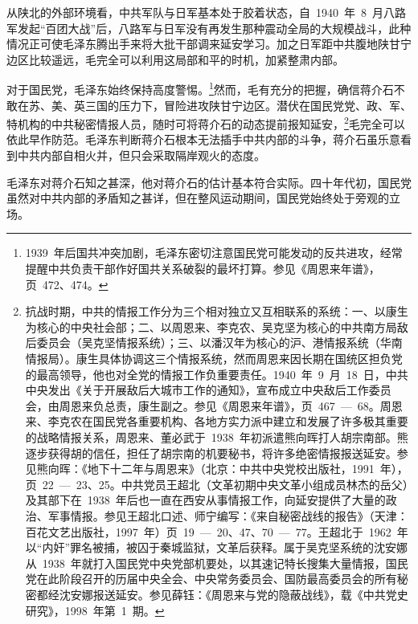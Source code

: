 从陕北的外部环境看，中共军队与日军基本处于胶着状态，自~1940~年~8~月八路军发起“百团大战”后，八路军与日军没有再发生那种震动全局的大规模战斗，此种情况正可使毛泽东腾出手来将大批干部调来延安学习。加之日军距中共腹地陕甘宁边区比较遥远，毛完全可以利用这局部和平的时机，加紧整肃内部。

对于国民党，毛泽东始终保持高度警惕。\footnote{1939~年后国共冲突加剧，毛泽东密切注意国民党可能发动的反共进攻，经常提醒中共负责干部作好国共关系破裂的最坏打算。参见《周恩来年谱》，页~472、474。}然而，毛有充分的把握，确信蒋介石不敢在苏、美、英三国的压力下，冒险进攻陕甘宁边区。潜伏在国民党党、政、军、特机构的中共秘密情报人员，随时可将蒋介石的动态提前报知延安，\footnote{抗战时期，中共的情报工作分为三个相对独立又互相联系的系统：一、以康生为核心的中央社会部；二、以周恩来、李克农、吴克坚为核心的中共南方局敌后委员会（吴克坚情报系统）；三、以潘汉年为核心的沪、港情报系统（华南情报局）。康生具体协调这三个情报系统，然而周恩来因长期在国统区担负党的最高领导，他也对全党的情报工作负重要责任。1940~年~9~月~18~日，中共中央发出《关于开展敌后大城市工作的通知》，宣布成立中央敌后工作委员会，由周恩来负总责，康生副之。参见《周恩来年谱》，页~467~—~68。周恩来、李克农在国民党各重要机构、各地方实力派中建立和发展了许多极其重要的战略情报关系，周恩来、董必武于~1938~年初派遣熊向晖打人胡宗南部。熊逐步获得胡的信任，担任了胡宗南的机要秘书，将许多绝密情报报送延安。参见熊向晖：《地下十二年与周恩来》（北京：中共中央党校出版社，1991~年），页~22~—~23、25。中共党员王超北（文革初期中央文革小组成员林杰的岳父）及其部下在~1938~年后也一直在西安从事情报工作，向延安提供了大量的政治、军事情报。参见王超北口述、师宁编写：《来自秘密战线的报告》（天津：百花文艺出版社，1997~年）页~19~—~20、47、70~—~77。王超北于~1962~年以“内奸”罪名被捕，被囚于秦城监狱，文革后获释。属于吴克坚系统的沈安娜从~1938~年就打入国民党中央党部机要处，以其速记特长搜集大量情报，国民党在此阶段召开的历届中央全会、中央常务委员会、国防最高委员会的所有秘密都经沈安娜报送延安。参见薛钰：《周恩来与党的隐蔽战线》，载《中共党史研究》，1998~年第~1~期。}毛完全可以依此早作防范。毛泽东判断蒋介石根本无法插手中共内部的斗争，蒋介石虽乐意看到中共内部自相火并，但只会采取隔岸观火的态度。

毛泽东对蒋介石知之甚深，他对蒋介石的估计基本符合实际。四十年代初，国民党虽然对中共内部的矛盾知之甚详，但在整风运动期间，国民党始终处于旁观的立场。


